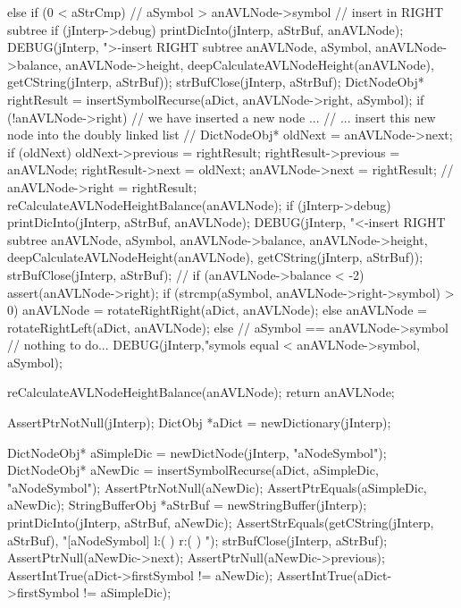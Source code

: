 {{{{      }
    }
  } else if (0 < aStrCmp) {
    // aSymbol > anAVLNode->symbol // insert in RIGHT subtree
    if (jInterp->debug) {
      printDicInto(jInterp, aStrBuf, anAVLNode);
      DEBUG(jInterp, ">-insert RIGHT subtree %
          anAVLNode, aSymbol, anAVLNode->balance,
          anAVLNode->height, deepCalculateAVLNodeHeight(anAVLNode),
          getCString(jInterp, aStrBuf));
      strBufClose(jInterp, aStrBuf);
    }
    DictNodeObj* rightResult =
      insertSymbolRecurse(aDict, anAVLNode->right, aSymbol);
    if (!anAVLNode->right) {
      // we have inserted a new node ...
      // ... insert this new node into the doubly linked list
      //
      DictNodeObj* oldNext           = anAVLNode->next;
      if (oldNext) oldNext->previous = rightResult;
      rightResult->previous          = anAVLNode;
      rightResult->next              = oldNext;
      anAVLNode->next                = rightResult;
      //
    }
    anAVLNode->right = rightResult;
    reCalculateAVLNodeHeightBalance(anAVLNode);
    if (jInterp->debug) {
      printDicInto(jInterp, aStrBuf, anAVLNode);
      DEBUG(jInterp, "<-insert RIGHT subtree %
          anAVLNode, aSymbol, anAVLNode->balance,
          anAVLNode->height, deepCalculateAVLNodeHeight(anAVLNode),
          getCString(jInterp, aStrBuf));
      strBufClose(jInterp, aStrBuf);
    }
    //
    if (anAVLNode->balance < -2) {
      assert(anAVLNode->right);
      if (strcmp(aSymbol, anAVLNode->right->symbol) > 0) {
        anAVLNode = rotateRightRight(aDict, anAVLNode);
      } else {
        anAVLNode = rotateRightLeft(aDict, anAVLNode);
      }
    }
  } else {
    // aSymbol == anAVLNode->symbol // nothing to do...
    DEBUG(jInterp,"symols equal <%
          anAVLNode->symbol, aSymbol);
  }

  reCalculateAVLNodeHeightBalance(anAVLNode);
  return anAVLNode;
}
\stopCCode

\startCTest
  AssertPtrNotNull(jInterp);
  DictObj *aDict = newDictionary(jInterp);
  
  DictNodeObj* aSimpleDic = newDictNode(jInterp, "aNodeSymbol");
  DictNodeObj* aNewDic = insertSymbolRecurse(aDict, aSimpleDic, "aNodeSymbol");
  AssertPtrNotNull(aNewDic);
  AssertPtrEquals(aSimpleDic, aNewDic);
  StringBufferObj *aStrBuf = newStringBuffer(jInterp);
  printDicInto(jInterp, aStrBuf, aNewDic);
  AssertStrEquals(getCString(jInterp, aStrBuf),
  "[aNodeSymbol] l:(  ) r:(  ) ");
  strBufClose(jInterp, aStrBuf);
  AssertPtrNull(aNewDic->next);
  AssertPtrNull(aNewDic->previous);
  AssertIntTrue(aDict->firstSymbol != aNewDic);
  AssertIntTrue(aDict->firstSymbol != aSimpleDic);
\stopCTest
\stopTestCase

